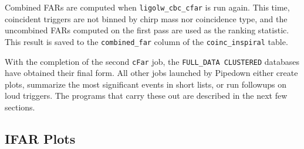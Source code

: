 Combined \acp{FAR} are computed when \verb|ligolw_cbc_cfar| is run again. This
time, coincident triggers are not binned by chirp mass nor coincidence type,
and the uncombined \acp{FAR} computed on the first pass are used as the ranking
statistic. This result is saved to the \verb|combined_far| column of the
\verb|coinc_inspiral| table.

With the completion of the second \verb|cFar| job, the \verb|FULL_DATA CLUSTERED|
databases have obtained their final form. All other jobs launched by
Pipedown either create plots, summarize the most significant events in short
lists, or run followups on loud triggers. The programs that carry these out are
described in the next few sections.

\subsection{IFAR Plots}
\label{sec:plotifar}

